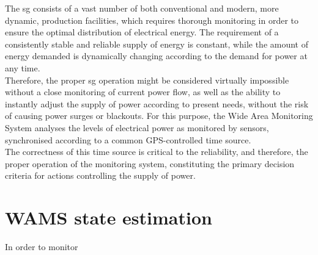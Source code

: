 The \acrshort{sg} consists of a vast number of both conventional and modern, more dynamic, production facilities, which requires thorough monitoring in order to ensure the optimal distribution of electrical energy. The requirement of a consistently stable and reliable supply of energy is constant, while the amount of energy demanded is dynamically changing according to the demand for power at any time. \\ 

Therefore, the proper \acrshort{sg} operation might be considered virtually impossible without a  close monitoring of current power flow, as well as the ability to instantly adjust the supply of power according to present needs,  without the risk of causing power surges or blackouts. For this purpose, the Wide Area Monitoring System analyses the levels of electrical power as monitored by sensors, synchronised according to a common GPS-controlled time source. \\ 

The correctness of this time source is critical to the reliability, and therefore, the proper operation of the monitoring system, constituting the primary decision criteria for actions controlling the supply of power.





\section{WAMS state estimation}
In order to monitor 


